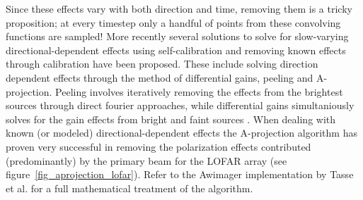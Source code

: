 Since these effects vary with both direction and time, removing them is a tricky proposition; at every timestep only a 
handful of points from these convolving functions are sampled! More recently several solutions to solve for slow-varying 
directional-dependent effects using self-calibration and removing known effects through calibration have been proposed. 
These include solving direction dependent effects through the method of differential gains, peeling and A-projection. Peeling 
involves iteratively removing the effects from the brightest sources through direct fourier approaches, while differential 
gains simultaniously solves for the gain effects from bright and faint sources \cite{2011A&A...527A.107S,2011A&A...527A.108S}. 
When dealing with known (or modeled) directional-dependent effects the A-projection algorithm \cite{bhatnagar2008correcting} has 
proven very successful in removing the polarization effects contributed (predominantly) by the primary beam for the 
LOFAR array (see figure~\ref{fig_aprojection_lofar}). Refer to the Awimager implementation by Tasse et 
al. \cite{tasse2013applying} for a full mathematical treatment of the algorithm.


